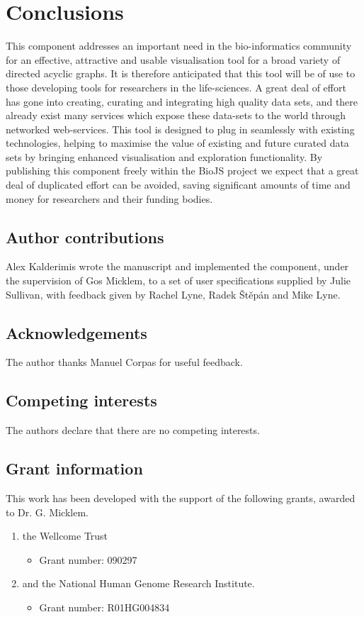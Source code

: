\documentclass[10pt,a4paper,twocolumn]{article}
\begin{document}
\section*{Conclusions}
This component addresses an important need in the
bio-informatics community for an effective, attractive and usable visualisation
tool for a broad variety of directed acyclic graphs.  It is therefore
anticipated that this tool will be of use to those developing tools for
researchers in the life-sciences. A great deal of effort has gone into creating,
curating and integrating high quality data sets, and there already exist many
services which expose these data-sets to the world through networked
web-services. This tool is designed to plug in seamlessly with existing
technologies, helping to maximise the value of existing and future curated data
sets by bringing enhanced visualisation and exploration functionality.  By
publishing this component freely within the BioJS project we expect that a great
deal of duplicated effort can be avoided, saving significant amounts of time and
money for researchers and their funding bodies.

\subsection*{Author contributions}
Alex Kalderimis wrote the manuscript and implemented the component, under the
supervision of Gos Micklem, to a set of user specifications supplied by Julie
Sullivan, with feedback given by Rachel Lyne, Radek Štěpán and Mike Lyne.

\subsection*{Acknowledgements}
The author thanks Manuel Corpas for useful feedback.

\subsection*{Competing interests}
The authors declare that there are no competing interests.

\subsection*{Grant information}
This work has been developed with the support of the following grants, awarded
to Dr. G. Micklem.

\begin{enumerate}
\item the Wellcome Trust
 \begin{itemize}
 \item{Grant number: 090297}
 \end{itemize}
\item and the National Human Genome Research Institute.
 \begin{itemize}
 \item{Grant number: R01HG004834}
 \end{itemize}
\end{enumerate}
\end{document}
